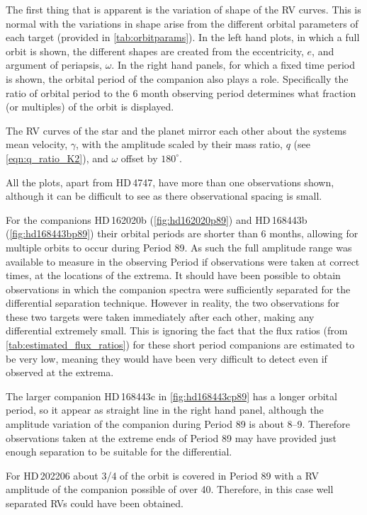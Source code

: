 The first thing that is apparent is the variation of shape of the {RV} curves.
This is normal with the variations in shape arise from the different orbital parameters of each target (provided in \cref{tab:orbitparams}).
In the left hand plots, in which a full orbit is shown, the different shapes are created from the eccentricity, \(e\), and argument of periapsis, \(\omega\).
In the right hand panels, for which a fixed time period is shown, the orbital period of the companion also plays a role.
Specifically the ratio of orbital period to the 6 month observing period determines what fraction (or multiples) of the orbit is displayed.

The {RV} curves of the star and the planet mirror each other about the systems mean velocity, \(\gamma\), with the amplitude scaled by their mass ratio, \(q\) (see \cref{eqn:q_ratio_K2}), and \(\omega\) offset by \(180^\circ\).

All the plots, apart from {HD\,4747}, have more than one observations shown, although it can be difficult to see as there observational spacing is small.

For the companions {HD\,162020}b (\cref{fig:hd162020p89}) and {HD\,168443}b (\cref{fig:hd168443bp89}) their orbital periods are shorter than 6 months, allowing for multiple orbits to occur during {Period 89}.
As such the full amplitude range was available to measure in the observing Period if observations were taken at correct times, at the locations of the extrema.
It should have been possible to obtain observations in which the companion spectra were sufficiently separated for the differential separation technique.
However in reality, the two observations for these two targets were taken immediately after each other, making any differential extremely small.
This is ignoring the fact that the flux ratios (from \cref{tab:estimated_flux_ratios}) for these short period companions are estimated to be very low, meaning they would have been very difficult to detect even if observed at the extrema.

The larger companion {HD\,168443}c in \cref{fig:hd168443cp89} has a longer orbital period, so it appear as straight line in the right hand panel, although the amplitude variation of the companion during {Period 89} is about 8--9\kmps.
Therefore observations taken at the extreme ends of {Period 89} may have provided just enough separation to be suitable for the differential.

For HD\,202206 about 3/4 of the orbit is covered in {Period 89} with a {RV} amplitude of the companion possible of over 40\kmps{}.
Therefore, in this case well separated {RV}s could have been obtained.

